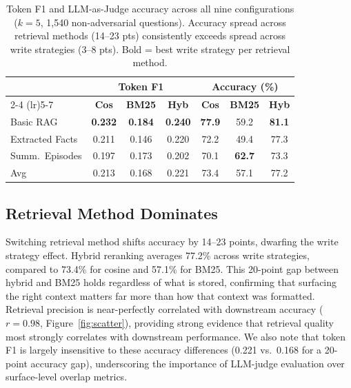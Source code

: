 \documentclass{article} %
\begin{document}
\begin{table}[H]
\caption{Token F1 and LLM-as-Judge accuracy across all nine configurations ($k{=}5$, 1,540 non-adversarial questions). Accuracy spread across retrieval methods (14--23 pts) consistently exceeds spread across write strategies (3--8 pts). Bold = best write strategy per retrieval method.}
\label{tab:main-grid}
\begin{center}
\small
\begin{tabular}{lccc|ccc}
\toprule
& \multicolumn{3}{c}{\textbf{Token F1}} & \multicolumn{3}{c}{\textbf{Accuracy (\%)}} \\
\cmidrule(lr){2-4} \cmidrule(lr){5-7}
& \textbf{Cos} & \textbf{BM25} & \textbf{Hyb} & \textbf{Cos} & \textbf{BM25} & \textbf{Hyb} \\
\midrule
Basic RAG & \textbf{0.232} & \textbf{0.184} & \textbf{0.240} & \textbf{77.9} & 59.2 & \textbf{81.1} \\
Extracted Facts & 0.211 & 0.146 & 0.220 & 72.2 & 49.4 & 77.3 \\
Summ.\ Episodes & 0.197 & 0.173 & 0.202 & 70.1 & \textbf{62.7} & 73.3 \\
\midrule
Avg & 0.213 & 0.168 & 0.221 & 73.4 & 57.1 & 77.2 \\
\bottomrule
\end{tabular}
\end{center}
\end{table}


\subsection{Retrieval Method Dominates}
Switching retrieval method shifts accuracy by 14--23 points, dwarfing the write strategy effect. Hybrid reranking averages 77.2\% across write strategies, compared to 73.4\% for cosine and 57.1\% for BM25. This 20-point gap between hybrid and BM25 holds regardless of what is stored, confirming that surfacing the right context matters far more than how that context was formatted. Retrieval precision is near-perfectly correlated with downstream accuracy ($r{=}0.98$, Figure~\ref{fig:scatter}), providing strong evidence that retrieval quality most strongly correlates with downstream performance. We also note that token F1 is largely insensitive to these accuracy differences (0.221 vs.\ 0.168 for a 20-point accuracy gap), underscoring the importance of LLM-judge evaluation over surface-level overlap metrics.
\end{document}
